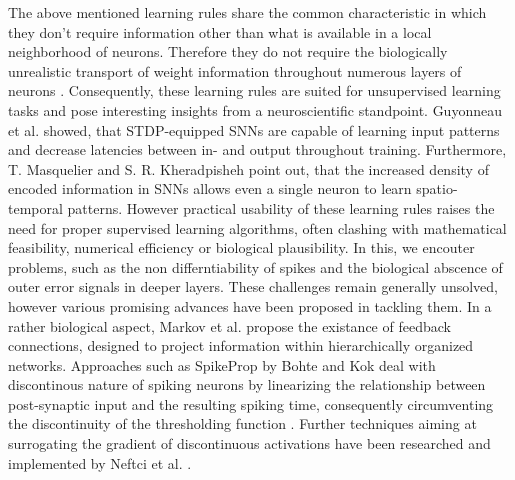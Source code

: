 \documentclass[letterpaper, 10 pt, conference]{ieeeconf}  %
\begin{document}
The above mentioned learning rules share the common characteristic in which they don't require information other than what is available 
in a local neighborhood of neurons. Therefore they do not require the biologically unrealistic 
transport of weight information throughout numerous layers of neurons \cite{samadiDeepLearningDynamic2017} \cite{chintaAdaptiveOptimalControl2012}
\cite{crickRecentExcitementNeural1989}\cite{decoNeurodynamicalCorticalModel2004}. Consequently, these learning rules 
are suited for unsupervised learning tasks and pose interesting 
insights from a neuroscientific standpoint. Guyonneau et al. \cite{masquelierSpikeTimingDependent2008} \cite{tavanaeiDeepLearningSpiking2019}
showed, that STDP-equipped SNNs are capable of learning input 
patterns and decrease latencies between in- and output throughout training. Furthermore, T. Masquelier \cite{masquelierSpikeTimingDependent2008}
and S. R. Kheradpisheh \cite{tavanaeiDeepLearningSpiking2019} point out, that 
the increased density of encoded information in SNNs allows even a single neuron to learn spatio-temporal patterns. However practical usability
of these learning rules raises the need for proper supervised learning algorithms, often clashing with mathematical feasibility, numerical efficiency 
or biological plausibility. In this, we encouter problems, such as the non differntiability of spikes and the biological abscence of outer error 
signals in deeper layers. These challenges remain generally unsolved, however various promising advances have been proposed in tackling them.
In a rather biological aspect, Markov et al.\cite{markovAnatomyHierarchyFeedforward2014} propose the existance of
feedback connections, designed to project information within
hierarchically organized networks. Approaches such as SpikeProp by Bohte and Kok deal with discontinous nature of spiking neurons by linearizing 
the relationship between post-synaptic input and the resulting spiking time, consequently circumventing the discontinuity of the 
thresholding function \cite{bohteSpikePropBackpropagationNetworks}. Further techniques aiming at surrogating the gradient of 
discontinuous activations have been researched 
and implemented by Neftci et al. \cite{neftciSurrogateGradientLearning2019}.
\end{document}
